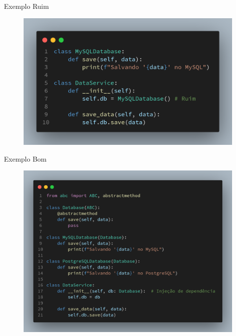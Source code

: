 \documentclass{libs/ufc_format}
\begin{document}
\begin{frame}{Exemplo \textcolor{gred}{Ruim}}
    \begin{figure}
        \centering
        \includegraphics[scale=0.20]{images/d_exemple_bad.png}
    \end{figure}
\end{frame}

\begin{frame}{Exemplo \textcolor{ggreen}{Bom}}
    \begin{figure}
        \centering
        \includegraphics[scale=0.14]{images/d_exemple_good.png}
    \end{figure}
\end{frame}

\begin{frame}{}
    \centering
    \huge{\textbf{}}
\end{frame}
\end{document}
